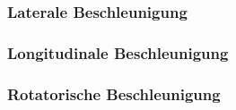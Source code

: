 

\subsubsection*{Laterale Beschleunigung}


\subsubsection*{Longitudinale Beschleunigung}


\subsubsection*{Rotatorische Beschleunigung}


\newpage

